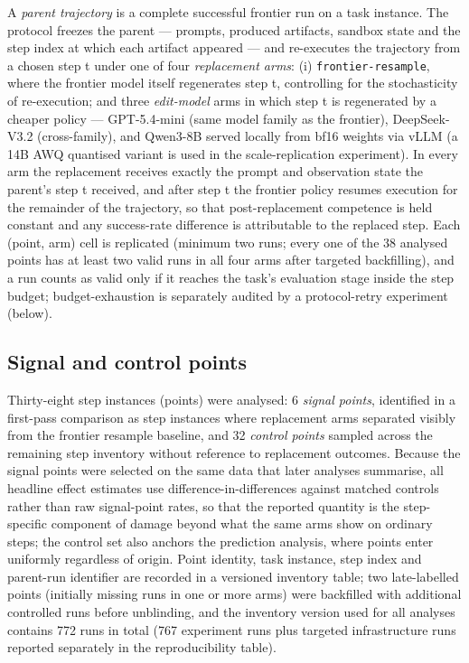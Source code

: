 A \emph{parent trajectory} is a complete successful frontier run on a task instance. The protocol freezes the parent --- prompts, produced artifacts, sandbox state and the step index at which each artifact appeared --- and re-executes the trajectory from a chosen step t under one of four \emph{replacement arms}: (i) \texttt{frontier-resample}, where the frontier model itself regenerates step t, controlling for the stochasticity of re-execution; and three \emph{edit-model} arms in which step t is regenerated by a cheaper policy --- GPT-5.4-mini (same model family as the frontier), DeepSeek-V3.2 (cross-family), and Qwen3-8B served locally from bf16 weights via vLLM (a 14B AWQ quantised variant is used in the scale-replication experiment). In every arm the replacement receives exactly the prompt and observation state the parent's step t received, and after step t the frontier policy resumes execution for the remainder of the trajectory, so that post-replacement competence is held constant and any success-rate difference is attributable to the replaced step. Each (point, arm) cell is replicated (minimum two runs; every one of the 38 analysed points has at least two valid runs in all four arms after targeted backfilling), and a run counts as valid only if it reaches the task's evaluation stage inside the step budget; budget-exhaustion is separately audited by a protocol-retry experiment (below).

\subsection*{Signal and control points}

Thirty-eight step instances (points) were analysed: 6 \emph{signal points}, identified in a first-pass comparison as step instances where replacement arms separated visibly from the frontier resample baseline, and 32 \emph{control points} sampled across the remaining step inventory without reference to replacement outcomes. Because the signal points were selected on the same data that later analyses summarise, all headline effect estimates use difference-in-differences against matched controls rather than raw signal-point rates, so that the reported quantity is the step-specific component of damage beyond what the same arms show on ordinary steps; the control set also anchors the prediction analysis, where points enter uniformly regardless of origin. Point identity, task instance, step index and parent-run identifier are recorded in a versioned inventory table; two late-labelled points (initially missing runs in one or more arms) were backfilled with additional controlled runs before unblinding, and the inventory version used for all analyses contains 772 runs in total (767 experiment runs plus targeted infrastructure runs reported separately in the reproducibility table).

